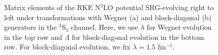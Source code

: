 \documentclass[preprintnumbers,floatfix,aps,prc,preprint,nofootinbib]{revtex4-1}
\begin{document}
\begin{figure}[H]
	\centering
	
	\caption{Matrix elements of the RKE N$^3$LO potential SRG-evolving right to left under transformations with Wegner (a) and block-diagonal (b) generators in the $^3$S$_1$ channel. Here, we use $\lambda$ for Wegner evolution in the top row and $\Lambda$ for block-diagonal evolution in the bottom row. For block-diagonal evolution, we fix $\lambda=1.5$ fm$^{-1}$.}
	\label{potential_contours_3S1_RKE}
\end{figure}
%
\end{document}
